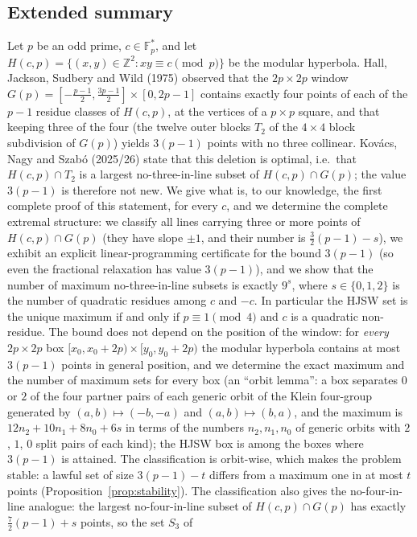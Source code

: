 \documentclass[11pt]{article}
\theoremstyle{remark}
\newcommand{\Fp}{\mathbb{F}_p}
\newcommand{\Z}{\mathbb{Z}}
\newcommand{\Hc}{H(c,p)}
\newcommand{\Gp}{G(p)}
\begin{document}
\subsection*{Extended summary}
Let $p$ be an odd prime, $c\in\Fp^*$, and let $\Hc=\{(x,y)\in\Z^2: xy\equiv c \pmod p\}$ be the modular hyperbola.
Hall, Jackson, Sudbery and Wild (1975) observed that the $2p\times2p$ window
$\Gp=[-\tfrac{p-1}{2},\tfrac{3p-1}{2}]\times[0,2p-1]$ contains exactly four points of each of the $p-1$ residue classes of
$\Hc$, at the vertices of a $p\times p$ square, and that keeping three of the four (the twelve outer blocks $T_2$ of the
$4\times4$ block subdivision of $\Gp$) yields $3(p-1)$ points with no three collinear.  Kov\'acs, Nagy and Szab\'o
(2025/26) state that this deletion is optimal, i.e.\ that $\Hc\cap T_2$ is a largest no-three-in-line subset of
$\Hc\cap\Gp$; the value $3(p-1)$ is therefore not new.  We give what is, to our knowledge, the first complete proof of
this statement, for every $c$, and we determine the complete extremal structure: we classify all lines carrying three or more points of $\Hc\cap\Gp$ (they have slope $\pm1$, and
their number is $\tfrac32(p-1)-s$), we exhibit an explicit linear-programming certificate for the bound $3(p-1)$
(so even the fractional relaxation has value $3(p-1)$), and we show that the number of maximum no-three-in-line
subsets is exactly $9^{s}$, where $s\in\{0,1,2\}$ is the number of quadratic residues among $c$ and $-c$.  In
particular the HJSW set is the unique maximum if and only if $p\equiv1\pmod 4$ and $c$ is a quadratic non-residue.
The bound does not depend on the position of the window: for \emph{every} $2p\times2p$ box $[x_0,x_0+2p)\times[y_0,y_0+2p)$
the modular hyperbola contains at most $3(p-1)$ points in general position, and we determine the exact maximum and the
number of maximum sets for every box (an ``orbit lemma'': a box separates $0$ or $2$ of the four partner pairs of each
generic orbit of the Klein four-group generated by $(a,b)\mapsto(-b,-a)$ and $(a,b)\mapsto(b,a)$, and the maximum is
$12n_{2}+10n_{1}+8n_{0}+6s$ in terms of the numbers $n_2,n_1,n_0$ of generic orbits with $2$, $1$, $0$ split pairs of each
kind); the HJSW box is among the boxes where
$3(p-1)$ is attained.  The classification is orbit-wise, which makes the problem stable: a lawful set of size $3(p-1)-t$ differs from a maximum one in at most
$t$ points (Proposition~\ref{prop:stability}).  The classification also gives the no-four-in-line
analogue: the largest no-four-in-line subset of $\Hc\cap\Gp$ has exactly $\tfrac72(p-1)+s$ points, so the set $S_3$ of
\end{document}
